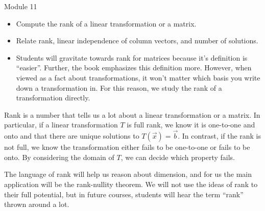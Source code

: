 \begin{lesson}

	Module 11

	\begin{itemize}
		\item Compute the rank of a linear transformation or a matrix.
		\item Relate rank, linear independence of column vectors, and number of solutions.
	\end{itemize}

	\begin{annotation}
		\begin{notes}
			\begin{itemize}
				\item Students will gravitate towards rank for matrices because it's definition
					is ``easier''. Further, the book emphasizes this definition more. However,
					when viewed as a fact about transformations, it won't matter which
					basis you write down a transformation in. For this reason, we study the
					rank of a transformation directly.
			\end{itemize}
		\end{notes}
	\end{annotation}
	Rank is a number that tells us a lot about a linear transformation or a matrix. In particular,
	if a linear transformation $T$ is full rank, we know it is one-to-one and onto and that there are unique
	solutions to $T(\vec x)=\vec b$. In contrast, if the rank is not full, we know the transformation either fails to be
	one-to-one or fails to be onto. By considering the domain of $T$, we can decide which property fails.

	The language of rank will help us reason about dimension, and for us the main application will be the
	rank-nullity theorem. We will not use the ideas of rank to their full potential, but in
	future courses, students will hear the term ``rank'' thrown around a lot.

\end{lesson}
	\bookonlynewpage

